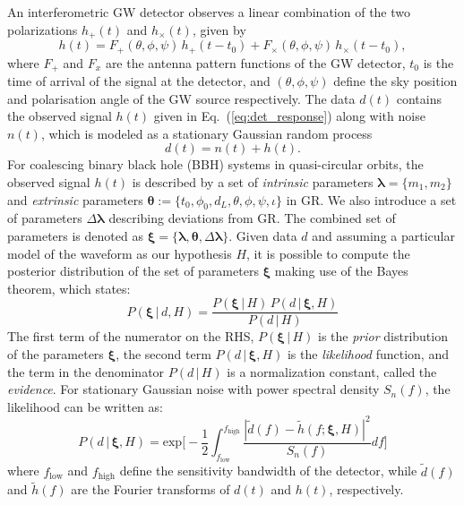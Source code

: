 \documentclass[prl,preprintnumbers,twocolumn,eqsecnum,floatfix,a4paper,nofootinbib,superscriptaddress]{revtex4}
\newcommand{\blambda}{\bm{\lambda}}
\newcommand{\btheta}{\bm{\theta}}
\newcommand{\bxi}{\bm{\xi}}
\begin{document}
An interferometric GW detector observes a linear combination of the two polarizations $h_+(t)$ and $h_\times(t)$, given by 
\begin{equation}
h(t) = F_+(\theta, \phi, \psi) \, h_+(t-t_0) + F_{\times}(\theta, \phi, \psi)\, {h}_{\times}(t-t_0), 
\label{eq:det_response}
\end{equation}
where $F_+$ and $F_x$ are the antenna pattern functions of the GW detector, $t_0$ is the time of arrival of the signal at the detector, and $(\theta, \phi, \psi)$ define the sky position and polarisation angle of the GW source respectively. The data $d(t)$ contains the observed signal $h(t)$ given in Eq.~(\ref{eq:det_response}) along with noise $n(t)$, which is modeled as a stationary Gaussian random process 
\begin{equation}
d(t) = n(t) + h(t). 
\label{eq:detector_strain}
\end{equation}
For coalescing binary black hole (BBH) systems in quasi-circular orbits, the observed signal $h(t)$ is described by a set of \emph{intrinsic} parameters $\blambda = \{m_1, m_2\}$ and \emph{extrinsic} parameters  $\btheta := \{t_0, \phi_0, d_L, \theta, \phi, \psi, \iota\}$ in GR. We also introduce a set of parameters $\Delta \blambda$ describing deviations from GR. The combined set of parameters is denoted as $\bxi = \{\blambda, \btheta, \Delta \blambda\}$.  Given data $d$ and assuming a particular model of the waveform as our hypothesis $H$, it is possible to compute the posterior distribution of the set of parameters ${\bxi}$ making use of the Bayes theorem, which states: 
\begin{equation}
P({\bxi} \, | \, d, H) = \frac{P({\bxi} \, | \, H) \, P (d \, | \, {\bxi}, H)}{P(d \, | \, H)}
\label{eq:Bayes_theorem}
\end{equation} 
The first term of the numerator on the RHS, $P({\bxi} \, | \, H)$ is the \emph{prior} distribution of the parameters ${\bxi}$, the second term $P (d \, | \, {\bxi}, H)$ is the \emph{likelihood} function, and the term in the denominator $P(d \, | \, H)$ is a normalization constant, called the \emph{evidence}. For stationary Gaussian noise with power spectral density $S_n(f)$, the likelihood can be written as:
\begin{equation}
P (d \, | \, {\bxi}, H) = \text{exp}\Big[ -\frac{1}{2}\int_{f_\mathrm{low}}^{f_\mathrm{high}} \frac{|\tilde{d}(f) - \tilde{h}(f;{\bxi}, H)|^2}{S_n(f)}df\Big]
\end{equation}
where $f_\mathrm{low}$ and $f_\mathrm{high}$ define the sensitivity bandwidth of the detector, while $\tilde{d}(f)$ and $\tilde{h}(f)$ are the Fourier transforms of $d(t)$ and $h(t)$, respectively. 
\end{document}
